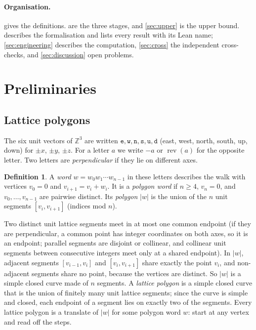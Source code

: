 \documentclass[11pt]{article}
\theoremstyle{plain}
\theoremstyle{definition}
\newtheorem{definition}[theorem]{Definition}
\theoremstyle{remark}
\newcommand{\word}[1]{\texttt{#1}}
\newcommand{\Z}{\mathbb{Z}}
\newcommand{\rev}{\operatorname{rev}}
\begin{document}
\paragraph{Organisation.}  gives the definitions. 
are the three stages, and \cref{sec:upper} is the upper bound.  describes the
formalisation and lists every result with its Lean name; \cref{sec:engineering} describes the
computation, \cref{sec:cross} the independent cross-checks, and \cref{sec:discussion} open problems.

\section{Preliminaries}\label{sec:prelim}

\subsection{Lattice polygons}

The six unit vectors of $\Z^3$ are written $\word{e},\word{w},\word{n},\word{s},\word{u},\word{d}$
(east, west, north, south, up, down) for $\pm x$, $\pm y$, $\pm z$. For a letter $a$ we write $-a$ or
$\rev(a)$ for the opposite letter. Two letters are \emph{perpendicular} if they lie on different axes.

\begin{definition}
A \emph{word} $w=w_0w_1\cdots w_{n-1}$ in these letters describes the walk with vertices $v_0=0$ and
$v_{i+1}=v_i+w_i$. It is a \emph{polygon word} if $n\ge 4$, $v_n=0$, and $v_0,\dots,v_{n-1}$ are
pairwise distinct. Its \emph{polygon} $|w|$ is the union of the $n$ unit segments $[v_i,v_{i+1}]$
(indices mod $n$).
\end{definition}

Two distinct unit lattice segments meet in at most one common endpoint (if they are perpendicular, a
common point has integer coordinates on both axes, so it is an endpoint; parallel segments are
disjoint or collinear, and collinear unit segments between consecutive integers meet only at a shared
endpoint). In $|w|$, adjacent segments $[v_{i-1},v_i]$ and $[v_i,v_{i+1}]$ share exactly the point
$v_i$, and non-adjacent segments share no point, because the vertices are distinct. So $|w|$ is a
simple closed curve made of $n$ segments. A \emph{lattice polygon} is a simple closed curve that is the
union of finitely many unit lattice segments; since the curve is simple and closed, each endpoint of
a segment lies on exactly two of the segments. Every
lattice polygon is a translate of $|w|$ for some polygon word $w$: start at any vertex and read off the
steps.
\end{document}

